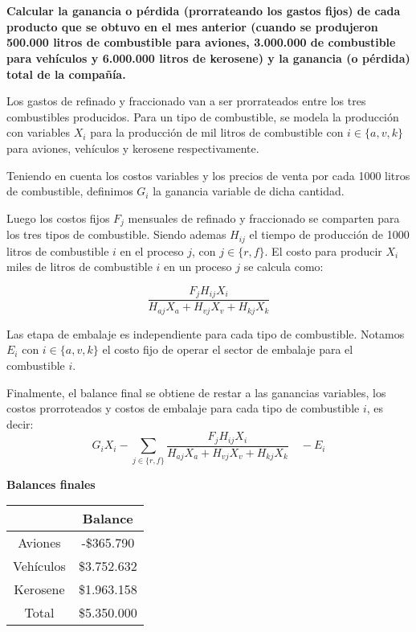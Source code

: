 \documentclass[10pt,a4paper]{article}
\begin{document}
\section{}
\textbf{Calcular la ganancia o pérdida (prorrateando los gastos fijos) de cada producto que se obtuvo en el mes
anterior (cuando se produjeron 500.000 litros de combustible para aviones, 3.000.000 de combustible para
vehículos y 6.000.000 litros de kerosene) y la ganancia (o pérdida) total de la compañía.}

\vspace{5mm}

Los gastos de refinado y fraccionado van a ser prorrateados entre los tres combustibles producidos. Para un tipo de combustible, se modela la producción con variables $X_i$ para la producción de mil litros de combustible con $i \in  \{a,v,k\}$ para aviones, vehículos y kerosene respectivamente.

Teniendo en cuenta los costos variables y los precios de venta por cada 1000 litros de combustible, definimos $G_i$ la ganancia variable de dicha cantidad.

Luego los costos fijos $F_j$ mensuales de refinado y fraccionado se comparten para los tres tipos de combustible. Siendo ademas $H_{ij}$ el tiempo de producción de 1000 litros de combustible $i$ en el proceso $j$, con $j \in \{r, f\}$. El costo para producir $X_i$ miles de litros de combustible $i$ en un proceso $j$ se calcula como:

$$
\frac{F_j H_{ij} X_i}{H_{aj}X_a + H_{vj}X_v + H_{kj}X_k}
$$

Las etapa de embalaje es independiente para cada tipo de combustible. Notamos $E_i$ con $i \in \{a,v,k\}$ el costo fijo de operar el sector de embalaje para el combustible $i$.

Finalmente, el balance final se obtiene de restar a las ganancias variables, los costos prorroteados y costos de embalaje para cada tipo de combustible $i$, es decir:
$$
G_i X_i - \sum_{j\in\{r,f\}}{\frac{F_j H_{ij} X_i}{H_{aj}X_a + H_{vj}X_v + H_{kj}X_k}} \quad  - E_i
$$

\clearpage

\begin{center}
	\textbf{Balances finales}
	\vspace{3mm}

	\begin{tabular}{| c | c |}
		\hline
		&           Balance    \\
		\hline
		Aviones   & -\$365.790  \\
		\hline
		Vehículos & \$3.752.632 \\
		\hline
		Kerosene  & \$1.963.158 \\
		\hline
		Total     & \$5.350.000\\
		\hline
	\end{tabular}
\end{center}
\end{document}
